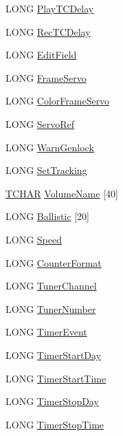 \begin{DoxyCompactItemize}
\item 
L\+O\+NG \hyperlink{structtag_t_r_a_n_s_p_o_r_t_b_a_s_i_c_p_a_r_m_s_a3f44b40383ee3e92fe772d884a44e3c9}{Play\+T\+C\+Delay}
\item 
L\+O\+NG \hyperlink{structtag_t_r_a_n_s_p_o_r_t_b_a_s_i_c_p_a_r_m_s_a8ce95ae57d0e2f7d56a03d7e9389f57e}{Rec\+T\+C\+Delay}
\item 
L\+O\+NG \hyperlink{structtag_t_r_a_n_s_p_o_r_t_b_a_s_i_c_p_a_r_m_s_a40e3f4dce178b6807d85e9ea09f9ffae}{Edit\+Field}
\item 
L\+O\+NG \hyperlink{structtag_t_r_a_n_s_p_o_r_t_b_a_s_i_c_p_a_r_m_s_a72933d3d5433e37f0c4996096c44830b}{Frame\+Servo}
\item 
L\+O\+NG \hyperlink{structtag_t_r_a_n_s_p_o_r_t_b_a_s_i_c_p_a_r_m_s_a2379b1712a45a217a1840edd234f9f20}{Color\+Frame\+Servo}
\item 
L\+O\+NG \hyperlink{structtag_t_r_a_n_s_p_o_r_t_b_a_s_i_c_p_a_r_m_s_a4e6ce9c29a96008c342f5dbaab97bc17}{Servo\+Ref}
\item 
L\+O\+NG \hyperlink{structtag_t_r_a_n_s_p_o_r_t_b_a_s_i_c_p_a_r_m_s_acca16909113e8958fdcb97b38e1dd0e9}{Warn\+Genlock}
\item 
L\+O\+NG \hyperlink{structtag_t_r_a_n_s_p_o_r_t_b_a_s_i_c_p_a_r_m_s_a9ba4dcbf9810aca25ad9fa424e806644}{Set\+Tracking}
\item 
\hyperlink{mapinls_8h_a03bdb8ce5895c7e261aadc2529637546}{T\+C\+H\+AR} \hyperlink{structtag_t_r_a_n_s_p_o_r_t_b_a_s_i_c_p_a_r_m_s_a172c457fb8dbcf92ed1b9010f5f569cd}{Volume\+Name} \mbox{[}40\mbox{]}
\item 
L\+O\+NG \hyperlink{structtag_t_r_a_n_s_p_o_r_t_b_a_s_i_c_p_a_r_m_s_a2bde8c7ce53dc7f20a15ce95987ac68d}{Ballistic} \mbox{[}20\mbox{]}
\item 
L\+O\+NG \hyperlink{structtag_t_r_a_n_s_p_o_r_t_b_a_s_i_c_p_a_r_m_s_a155c6448f328e7aae0ddd53e47d503e2}{Speed}
\item 
L\+O\+NG \hyperlink{structtag_t_r_a_n_s_p_o_r_t_b_a_s_i_c_p_a_r_m_s_ad83eec9e23a909dff72898081495061b}{Counter\+Format}
\item 
L\+O\+NG \hyperlink{structtag_t_r_a_n_s_p_o_r_t_b_a_s_i_c_p_a_r_m_s_a07642ffbb8d70d3fe4f83fc50768c585}{Tuner\+Channel}
\item 
L\+O\+NG \hyperlink{structtag_t_r_a_n_s_p_o_r_t_b_a_s_i_c_p_a_r_m_s_a901718f7305e5f2cb5718e3e9d9ce31b}{Tuner\+Number}
\item 
L\+O\+NG \hyperlink{structtag_t_r_a_n_s_p_o_r_t_b_a_s_i_c_p_a_r_m_s_a117b8f8f8c54e2b0de4bacbf0ae877e9}{Timer\+Event}
\item 
L\+O\+NG \hyperlink{structtag_t_r_a_n_s_p_o_r_t_b_a_s_i_c_p_a_r_m_s_a54cb8510311a539b5833ff7713c54b8d}{Timer\+Start\+Day}
\item 
L\+O\+NG \hyperlink{structtag_t_r_a_n_s_p_o_r_t_b_a_s_i_c_p_a_r_m_s_ae35885d2e5c044d8ba56ac0f6a833956}{Timer\+Start\+Time}
\item 
L\+O\+NG \hyperlink{structtag_t_r_a_n_s_p_o_r_t_b_a_s_i_c_p_a_r_m_s_a7ef5f3d2d2bd52ebbbf920b7f2bf2da2}{Timer\+Stop\+Day}
\item 
L\+O\+NG \hyperlink{structtag_t_r_a_n_s_p_o_r_t_b_a_s_i_c_p_a_r_m_s_a692377d56377edf1f7c0701b5838054c}{Timer\+Stop\+Time}
\end{DoxyCompactItemize}


